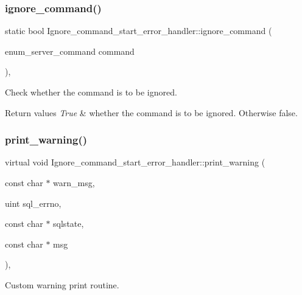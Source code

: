 \subsubsection{\texorpdfstring{ignore\+\_\+command()}{ignore\_command()}}
{\footnotesize\ttfamily static bool Ignore\+\_\+command\+\_\+start\+\_\+error\+\_\+handler\+::ignore\+\_\+command (\begin{DoxyParamCaption}\item[{enum\+\_\+server\+\_\+command}]{command }\end{DoxyParamCaption})\hspace{0.3cm}{\ttfamily [inline]}, {\ttfamily [static]}}



Check whether the command is to be ignored. 


\begin{DoxyRetVals}{Return values}
{\em True} & whether the command is to be ignored. Otherwise false. \\
\hline
\end{DoxyRetVals}
\mbox{\label{classIgnore__command__start__error__handler_a182e2ebd517169e1138bbbf3999896ac}} 
\subsubsection{\texorpdfstring{print\+\_\+warning()}{print\_warning()}}
{\footnotesize\ttfamily virtual void Ignore\+\_\+command\+\_\+start\+\_\+error\+\_\+handler\+::print\+\_\+warning (\begin{DoxyParamCaption}\item[{const char $\ast$}]{warn\+\_\+msg,  }\item[{uint}]{sql\+\_\+errno,  }\item[{const char $\ast$}]{sqlstate,  }\item[{const char $\ast$}]{msg }\end{DoxyParamCaption})\hspace{0.3cm}{\ttfamily [inline]}, {\ttfamily [virtual]}}



Custom warning print routine. 


